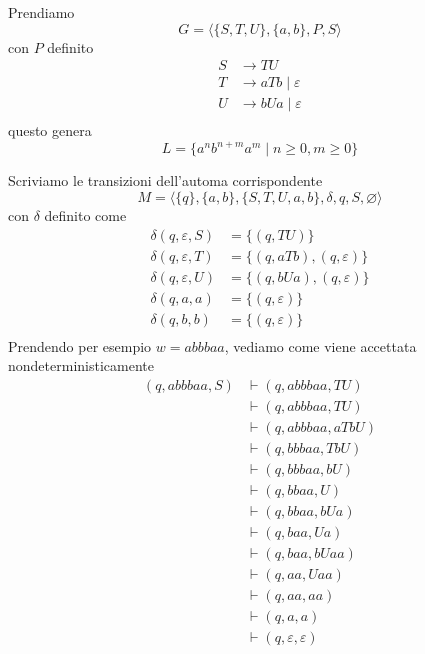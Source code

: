 \documentclass[12pt]{report}
\theoremstyle{definition}
\theoremstyle{regard}
\begin{document}
\begin{tcolorbox}[breakable]
 	Prendiamo
 	$$ G = \langle \{S, T, U\}, \{a, b\}, P, S \rangle $$
 	con $P$ definito
 	\begin{align*}
 		S &\rightarrow TU  \\
 		T &\rightarrow a T b \mid \varepsilon \\
 		U &\rightarrow b U a \mid \varepsilon \\
 	\end{align*}
 	questo genera
 	$$ L = \{ a^n b^{n + m} a^m \mid n \geq 0, m \geq 0 \} $$
 
 	Scriviamo le transizioni dell'automa corrispondente
 	$$ M = \langle \{q\}, \{a, b\}, \{S, T, U, a, b\}, \delta, q, S, \varnothing \rangle $$
 	con $\delta$ definito come
 	\begin{align*}
 		\delta(q, \varepsilon, S) &= \{(q, TU)\} \\
 		\delta(q, \varepsilon, T) &= \{(q, a T b), (q, \varepsilon) \} \\
 		\delta(q, \varepsilon, U) &= \{(q, b U a), (q, \varepsilon) \} \\
 		\delta(q, a, a) &= \{(q, \varepsilon)\} \\
 		\delta(q, b, b) &= \{(q, \varepsilon)\} \\
 	\end{align*}
 	\newpage
 	Prendendo per esempio $w = abbbaa$, vediamo come viene accettata nondeterministicamente
 	\begin{align*}
 		(q, abbbaa, S) &\vdash (q, abbbaa, TU) \\
 		               &\vdash (q, abbbaa, TU) \\
 		               &\vdash (q, abbbaa, aTbU) \\
 		               &\vdash (q, bbbaa, TbU) \\
 		               &\vdash (q, bbbaa, bU) \\
 		               &\vdash (q, bbaa, U) \\
 		               &\vdash (q, bbaa, bUa) \\
 		               &\vdash (q, baa, Ua) \\
		               &\vdash (q, baa, bUaa) \\
 		               &\vdash (q, aa, Uaa) \\
 		               &\vdash (q, aa, aa) \\
 		               &\vdash (q, a, a) \\
 		               &\vdash (q, \varepsilon, \varepsilon) \\

\end{align*}
\end{tcolorbox}
\end{document}
